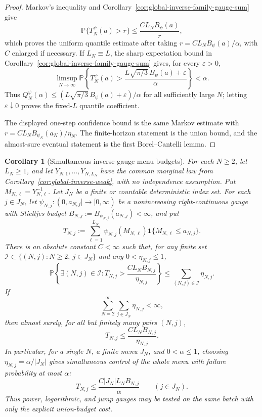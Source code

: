 \documentclass[11pt]{amsart}
\numberwithin{equation}{section}
\newtheorem{corollary}[theorem]{Corollary}
\theoremstyle{definition}
\theoremstyle{remark}
\newcommand{\Prob}{\mathbb P}
\newcommand{\eps}{\varepsilon}
\begin{document}
\begin{proof}
Markov's inequality and Corollary~\ref{cor:global-inverse-family-gauge-sum}
give
\[
  \Prob\{T_N^\psi(a)>r\}
  \le
  \frac{C L_NB_\psi(a)}{r},
\]
which proves the uniform quantile estimate after taking
\(r=C L_NB_\psi(a)/\alpha\), with \(C\) enlarged if necessary.  If \(L_N\equiv L\),
the sharp expectation bound in
Corollary~\ref{cor:global-inverse-family-gauge-sum} gives, for every
\(\eps>0\),
\[
  \limsup_{N\to\infty}
  \Prob\left\{
    T_N^\psi(a)>
    \frac{L\sqrt{\pi/3}\,B_\psi(a)+\eps}{\alpha}
  \right\}
  <\alpha .
\]
Thus \(Q_N^\psi(\alpha)\le
(L\sqrt{\pi/3}\,B_\psi(a)+\eps)/\alpha\) for all sufficiently large \(N\);
letting \(\eps\downarrow0\) proves the fixed-\(L\) quantile coefficient.

The displayed one-step confidence bound is the same Markov estimate with
\(r=C L_NB_{\psi_N}(a_N)/\eta_N\).  The finite-horizon statement is the union
bound, and the almost-sure eventual statement is the first Borel--Cantelli
lemma.
\end{proof}

\begin{corollary}[Simultaneous inverse-gauge menu budgets]
\label{cor:global-inverse-family-gauge-menu}
For each \(N\ge2\), let \(L_N\ge1\), and let
\(Y_{N,1},\ldots,Y_{N,L_N}\) have the common marginal law from
Corollary~\ref{cor:global-inverse-weak}, with no independence assumption.  Put
\(M_{N,\ell}=Y_{N,\ell}^{-1}\).  Let \(J_N\) be a finite or countable
deterministic index set.  For each \(j\in J_N\), let
\(\psi_{N,j}:(0,a_{N,j}]\to[0,\infty)\) be a nonincreasing right-continuous
gauge with Stieltjes budget \(B_{N,j}:=B_{\psi_{N,j}}(a_{N,j})<\infty\), and
put
\[
  T_{N,j}:=
  \sum_{\ell=1}^{L_N}
  \psi_{N,j}(M_{N,\ell})\mathbf1\{M_{N,\ell}\le a_{N,j}\}.
\]
There is an absolute constant \(C<\infty\) such that, for any finite set
\(\mathcal I\subset\{(N,j):N\ge2,\ j\in J_N\}\) and any
\(0<\eta_{N,j}\le1\),
\[
  \Prob\left\{
    \exists (N,j)\in\mathcal I:
    T_{N,j}>\frac{C L_NB_{N,j}}{\eta_{N,j}}
  \right\}
  \le
  \sum_{(N,j)\in\mathcal I}\eta_{N,j}.
\]
If
\[
  \sum_{N=2}^\infty\sum_{j\in J_N}\eta_{N,j}<\infty ,
\]
then almost surely, for all but finitely many pairs \((N,j)\),
\[
  T_{N,j}\le \frac{C L_NB_{N,j}}{\eta_{N,j}}.
\]
In particular, for a single \(N\), a finite menu \(J_N\), and
\(0<\alpha\le1\), choosing \(\eta_{N,j}=\alpha/|J_N|\) gives simultaneous
control of the whole menu with failure probability at most \(\alpha\):
\[
  T_{N,j}\le \frac{C |J_N| L_NB_{N,j}}{\alpha}
  \qquad(j\in J_N).
\]
Thus power, logarithmic, and jump gauges may be tested on the same batch with
only the explicit union-budget cost.
\end{corollary}
\end{document}
